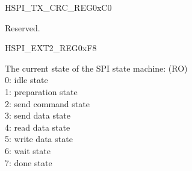 \begin{register}{H}{SPI\_TX\_CRC\_REG}{0xC0}\label{regdesc:SPITXCRCREG}
%
\regnewline%
\begin{regdesc}\begin{reglist}
\item [SPI\_TX\_CRC\_REG] Reserved.
\end{reglist}\end{regdesc}
\end{register}


\begin{register}{H}{SPI\_EXT2\_REG}{0xF8}\label{regdesc:SPIEXT2REG}
%
%
\regnewline%
\begin{regdesc}\begin{reglist}
\item [SPI\_ST]The current state of the SPI state machine: (RO) \\
0:  idle state\\
1:  preparation state\\
2:  send command state\\
3:  send data state\\
4:  read data state\\
5:  write data state\\
6:  wait state\\
7:  done state\\
\end{reglist}\end{regdesc}
\end{register}


